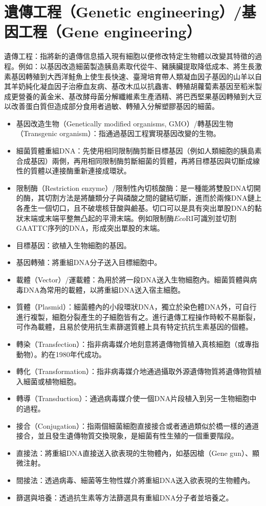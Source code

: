 \documentclass[a4paper,12pt]{report}
\begin{document}
\section{遺傳工程（Genetic engineering）/基因工程（Gene engineering）}
遺傳工程：指將新的遺傳信息插入現有細胞以便修改特定生物體以改變其特徵的過程。例如：以基因改造細菌製造胰島素取代從牛、豬胰臟提取降低成本、將生長激素基因轉殖到大西洋鮭魚上使生長快速、臺灣培育帶人類凝血因子基因的山羊以自其羊奶純化凝血因子治療血友病、基改木瓜以抗蟲害、轉殖胡蘿蔔素基因至稻米製成更營養的黃金米、基改酵母菌分解纖維素生產酒精、將巴西堅果基因轉殖到大豆以改善蛋白質但造成部分食用者過敏、轉殖入分解塑膠基因的細菌。
\begin{itemize}
\item 基因改造生物（Genetically modified organisms, GMO）/轉基因生物（Transgenic organism）：指通過基因工程實現基因改變的生物。
\item 細菌質體重組DNA：先使用相同限制酶剪斷目標基因（例如人類細胞的胰島素合成基因）兩側，再用相同限制酶剪斷細菌的質體，再將目標基因與切斷成線性的質體以連接酶重新連接成環狀。
\item 限制酶（Restriction enzyme）/限制性內切核酸酶：是一種能將雙股DNA切開的酶，其切割方法是將醣類分子與磷酸之間的鍵結切斷，進而於兩條DNA鏈上各產生一個切口，且不破壞核苷酸與鹼基。切口可以是具有突出單股DNA的黏狀末端或末端平整無凸起的平滑末端。例如限制酶$Eco$RI可識別並切割GAATTC序列的DNA，形成突出單股的末端。
\item 目標基因：欲植入生物細胞的基因。
\item 基因轉殖：將重組DNA分子送入目標細胞中。
\item 載體（Vector）/運載體：為用於將一段DNA送入生物細胞內。細菌質體與病毒DNA為常用的載體，以將重組DNA送入宿主細胞。
\item 質體（Plasmid）：細菌體內的小段環狀DNA，獨立於染色體DNA外，可自行進行複製，細胞分裂產生的子細胞皆有之。進行遺傳工程操作時較不易斷裂，可作為載體，且易於使用抗生素篩選質體上具有特定抗抗生素基因的個體。
\item 轉染（Transfection）：指非病毒媒介地刻意將遺傳物質植入真核細胞（或專指動物）。約在1980年代成功。
\item 轉化（Transformation）：指非病毒媒介地通過攝取外源遺傳物質將遺傳物質植入細菌或植物細胞。
\item 轉導（Transduction）：通過病毒媒介使一個DNA片段植入到另一生物細胞中的過程。
\item 接合（Conjugation）：指兩個細菌細胞直接接合或者通過類似於橋一樣的通道接合，並且發生遺傳物質交換現象，是細菌有性生殖的一個重要階段。
\item 直接法：將重組DNA直接送入欲表現的生物體內，如基因槍（Gene gun）、顯微注射。
\item 間接法：透過病毒、細菌等生物性媒介將重組DNA送入欲表現的生物體內。
\item 篩選與培養：透過抗生素等方法篩選具有重組DNA分子者並培養之。
\end{itemize}
\end{document}
